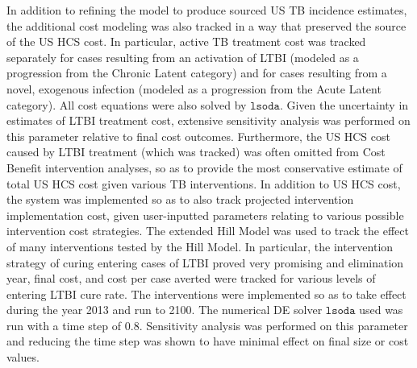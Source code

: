 \documentclass{amsart}
\begin{document}
In addition to refining the model to produce sourced US TB incidence estimates,
the additional cost modeling was also tracked in a way that preserved the source
of the US HCS cost. In particular, active TB treatment cost was tracked
separately for cases resulting from an activation of LTBI (modeled as a
progression from the Chronic Latent category) and for cases resulting from a
novel, exogenous infection (modeled as a progression from the Acute Latent
category). All cost equations were also solved by $\texttt{lsoda}$.  Given the
uncertainty in estimates of LTBI treatment cost, extensive sensitivity analysis
was performed on this parameter relative to final cost outcomes. Furthermore,
the US HCS cost caused by LTBI treatment (which was tracked) was often omitted
from Cost Benefit intervention analyses, so as to provide the most conservative
estimate of total US HCS cost given various TB interventions. In addition to US
HCS cost, the system was implemented so as to also track projected intervention
implementation cost, given user-inputted parameters relating to various possible
intervention cost strategies. The extended Hill Model was used to track the
effect of many interventions tested by the Hill Model. In particular, the
intervention strategy of curing entering cases of LTBI proved very promising and
elimination year, final cost, and cost per case averted were tracked for various
levels of entering LTBI cure rate. The interventions were implemented so as to
take effect during the year 2013 and run to 2100. The numerical DE solver
$\texttt{lsoda}$ used was run with a time step of $0.8$. Sensitivity analysis
was performed on this parameter and reducing the time step was shown to have
minimal effect on final size or cost values.
\end{document}
